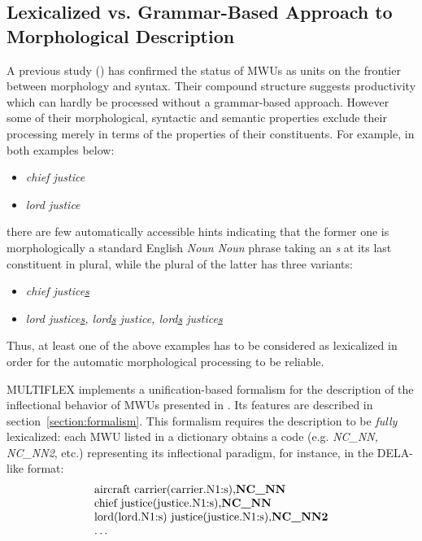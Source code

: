 \subsection{Lexicalized vs. Grammar-Based Approach to Morphological Description}
A previous study (\cite{these-Savary}) has confirmed the status of MWUs
as units on the frontier between morphology and syntax. Their compound structure suggests 
productivity which can hardly be processed without a grammar-based approach.
However some of their morphological, syntactic and semantic properties exclude their 
processing merely in terms of the properties of their constituents. For example, 
in both examples below:

\begin{itemize}
\item \emph{chief justice}
\item \emph{lord justice}
\end{itemize} 

\noindent there are few automatically accessible hints indicating that the former one is morphologically 
a standard English \emph{Noun Noun} phrase taking an \emph{s} at its last constituent in plural, 
while the plural of the latter has three variants:
 
\begin{itemize}
\item \emph{chief justice\underline{s}}
\item \emph{lord justice\underline{s}, lord\underline{s} justice,
lord\underline{s} justice\underline{s}}
\end{itemize}
 
\bigskip
\noindent Thus, at least one of the above examples has to be considered as lexicalized in 
order for the automatic morphological processing to be reliable.

\bigskip
\noindent MULTIFLEX implements a unification-based formalism for the
description of the inflectional behavior of MWUs presented in \cite{Savary05}. Its features are described 
in section~\ref{section:formalism}. This formalism requires the description to
be \emph{fully} lexicalized: each MWU listed in a dictionary obtains a code (e.g. \emph{NC\_NN, NC\_NN2}, etc.) 
representing its inflectional paradigm, for instance, in the DELA-like format:
\[
\begin{array}[c]{l}
  $aircraft carrier(carrier.N1:s),\textbf{NC\_NN}$ \\
  $chief justice(justice.N1:s),\textbf{NC\_NN}$ \\
  $lord(lord.N1:s) justice(justice.N1:s),\textbf{NC\_NN2}$ \\
  \dots
\end{array}
\]

